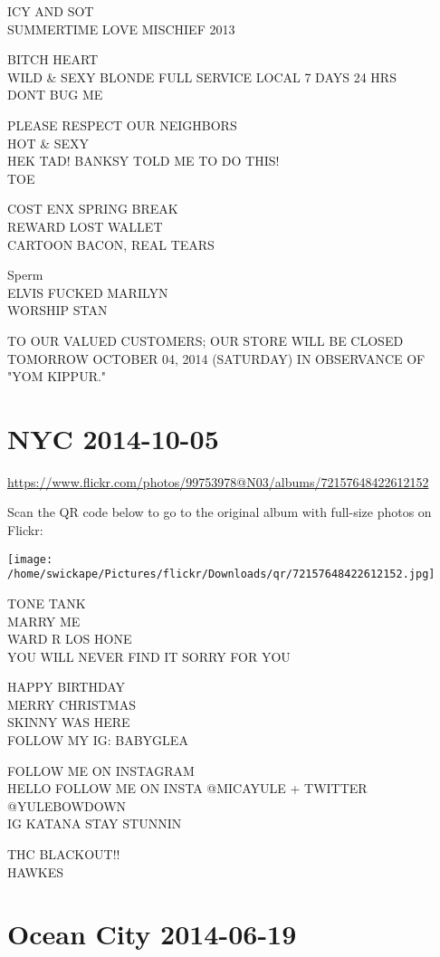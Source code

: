 \documentclass[10pt,letterpaper]{article}
\begin{document}
ICY AND SOT\\
SUMMERTIME LOVE MISCHIEF 2013

BITCH HEART\\
WILD \& SEXY BLONDE FULL SERVICE LOCAL 7 DAYS 24 HRS\\
DONT BUG ME

PLEASE RESPECT OUR NEIGHBORS\\
HOT \& SEXY\\
HEK TAD! BANKSY TOLD ME TO DO THIS!\\
TOE

COST ENX SPRING BREAK\\
REWARD LOST WALLET\\
CARTOON BACON, REAL TEARS

Sperm\\
ELVIS FUCKED MARILYN\\
WORSHIP STAN

TO OUR VALUED CUSTOMERS; OUR STORE WILL BE CLOSED TOMORROW OCTOBER 04, 2014 (SATURDAY) IN OBSERVANCE OF "YOM KIPPUR."
\pagebreak

\section*{NYC 2014-10-05}

\url{https://www.flickr.com/photos/99753978@N03/albums/72157648422612152}

Scan the QR code below to go to the original album with full-size photos on Flickr:

\texttt{[image: /home/swickape/Pictures/flickr/Downloads/qr/72157648422612152.jpg]}
\pagebreak

TONE TANK\\
MARRY ME\\
WARD R LOS HONE\\
YOU WILL NEVER FIND IT SORRY FOR YOU

HAPPY BIRTHDAY\\
MERRY CHRISTMAS\\
SKINNY WAS HERE\\
FOLLOW MY IG: BABYGLEA

FOLLOW ME ON INSTAGRAM\\
HELLO FOLLOW ME ON INSTA @MICAYULE + TWITTER @YULEBOWDOWN\\
IG KATANA STAY STUNNIN

THC BLACKOUT!!\\
HAWKES
\pagebreak

\section*{Ocean City 2014-06-19}
\end{document}
